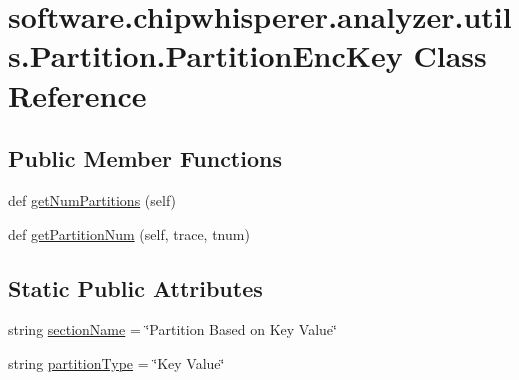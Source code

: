 \hypertarget{classsoftware_1_1chipwhisperer_1_1analyzer_1_1utils_1_1Partition_1_1PartitionEncKey}{}\section{software.\+chipwhisperer.\+analyzer.\+utils.\+Partition.\+Partition\+Enc\+Key Class Reference}
\label{classsoftware_1_1chipwhisperer_1_1analyzer_1_1utils_1_1Partition_1_1PartitionEncKey}
\subsection*{Public Member Functions}
\begin{DoxyCompactItemize}
\item 
def \hyperlink{classsoftware_1_1chipwhisperer_1_1analyzer_1_1utils_1_1Partition_1_1PartitionEncKey_ae0c037b6e17be8131e289f7c12ff9049}{get\+Num\+Partitions} (self)
\item 
def \hyperlink{classsoftware_1_1chipwhisperer_1_1analyzer_1_1utils_1_1Partition_1_1PartitionEncKey_a422e6af196ab146fb57ad9ff3e83475d}{get\+Partition\+Num} (self, trace, tnum)
\end{DoxyCompactItemize}
\subsection*{Static Public Attributes}
\begin{DoxyCompactItemize}
\item 
string \hyperlink{classsoftware_1_1chipwhisperer_1_1analyzer_1_1utils_1_1Partition_1_1PartitionEncKey_a2832fddf895a8280a5b33972a2ff0985}{section\+Name} = \char`\"{}Partition Based on Key Value\char`\"{}
\item 
string \hyperlink{classsoftware_1_1chipwhisperer_1_1analyzer_1_1utils_1_1Partition_1_1PartitionEncKey_a43e21ae27401f13b820d68ed36120133}{partition\+Type} = \char`\"{}Key Value\char`\"{}
\end{DoxyCompactItemize}


